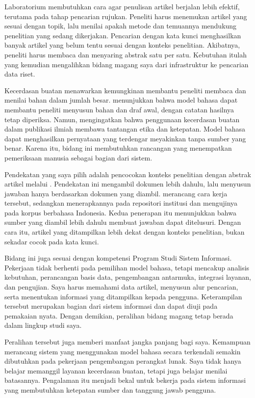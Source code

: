 Laboratorium membutuhkan cara agar penulisan artikel berjalan lebih efektif,
terutama pada tahap pencarian rujukan. Peneliti harus menemukan artikel yang
sesuai dengan topik, lalu menilai apakah metode dan temuannya mendukung
penelitian yang sedang dikerjakan. Pencarian dengan kata kunci menghasilkan
banyak artikel yang belum tentu sesuai dengan konteks penelitian. Akibatnya,
peneliti harus membaca dan menyaring abstrak satu per satu. Kebutuhan itulah
yang kemudian mengalihkan bidang magang saya dari infrastruktur ke pencarian
data riset.

Kecerdasan buatan menawarkan kemungkinan membantu peneliti membaca dan menilai
bahan dalam jumlah besar. \citet{munawar2023manfaat} menunjukkan bahwa model
bahasa dapat membantu peneliti menyusun bahan dan draf awal, dengan catatan
hasilnya tetap diperiksa. Namun, \citet{ariqo2025analisis} mengingatkan bahwa
penggunaan kecerdasan buatan dalam publikasi ilmiah membawa tantangan etika dan
ketepatan. Model bahasa dapat menghasilkan pernyataan yang terdengar meyakinkan
tanpa sumber yang benar. Karena itu, bidang ini membutuhkan rancangan yang
menempatkan pemeriksaan manusia sebagai bagian dari sistem.

Pendekatan yang saya pilih adalah pencocokan konteks penelitian dengan abstrak
artikel melalui . Pendekatan ini
mengambil dokumen lebih dahulu, lalu menyusun jawaban hanya berdasarkan dokumen
yang diambil. \citet{lewis2020retrieval} merancang cara kerja tersebut, sedangkan
\citet{budi2024repositori} menerapkannya pada repositori institusi dan
\citet{tohir2024utilizing} mengujinya pada korpus berbahasa Indonesia. Kedua
penerapan itu menunjukkan bahwa sumber yang diambil lebih dahulu membuat
jawaban dapat ditelusuri. Dengan cara itu, artikel yang ditampilkan lebih dekat
dengan konteks penelitian, bukan sekadar cocok pada kata kunci.

Bidang ini juga sesuai dengan kompetensi Program Studi Sistem Informasi.
Pekerjaan tidak berhenti pada pemilihan model bahasa, tetapi mencakup analisis
kebutuhan, perancangan basis data, pengembangan antarmuka, integrasi layanan,
dan pengujian. Saya harus memahami data artikel, menyusun alur pencarian, serta
menentukan informasi yang ditampilkan kepada pengguna. Keterampilan tersebut
merupakan bagian dari sistem informasi dan dapat diuji pada pemakaian nyata.
Dengan demikian, peralihan bidang magang tetap berada dalam lingkup studi saya.

Peralihan tersebut juga memberi manfaat jangka panjang bagi saya. Kemampuan
merancang sistem yang menggunakan model bahasa secara terkendali semakin
dibutuhkan pada pekerjaan pengembangan perangkat lunak. Saya tidak hanya belajar
memanggil layanan kecerdasan buatan, tetapi juga belajar menilai batasannya.
Pengalaman itu menjadi bekal untuk bekerja pada sistem informasi yang
membutuhkan ketepatan sumber dan tanggung jawab pengguna.
